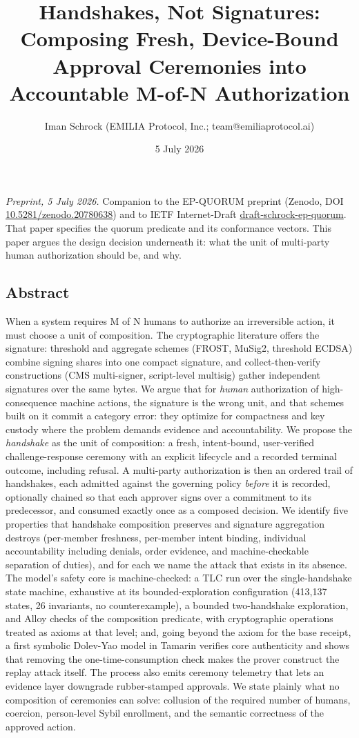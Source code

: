 \documentclass[
  11pt,
]{article}
\title{Handshakes, Not Signatures: Composing Fresh, Device-Bound Approval
Ceremonies into Accountable M-of-N Authorization}
\author{Iman Schrock (EMILIA Protocol, Inc.; team@emiliaprotocol.ai)}
\date{5 July 2026}
\begin{document}
\maketitle

\emph{Preprint, 5 July 2026.} Companion to the EP-QUORUM preprint
(Zenodo, DOI
\href{https://doi.org/10.5281/zenodo.20780638}{10.5281/zenodo.20780638})
and to IETF Internet-Draft
\href{https://datatracker.ietf.org/doc/draft-schrock-ep-quorum/}{draft-schrock-ep-quorum}.
That paper specifies the quorum predicate and its conformance vectors.
This paper argues the design decision underneath it: what the unit of
multi-party human authorization should be, and why.

\subsection{Abstract}\label{abstract}

When a system requires M of N humans to authorize an irreversible
action, it must choose a unit of composition. The cryptographic
literature offers the signature: threshold and aggregate schemes (FROST,
MuSig2, threshold ECDSA) combine signing shares into one compact
signature, and collect-then-verify constructions (CMS multi-signer,
script-level multisig) gather independent signatures over the same
bytes. We argue that for \emph{human} authorization of high-consequence
machine actions, the signature is the wrong unit, and that schemes built
on it commit a category error: they optimize for compactness and key
custody where the problem demands evidence and accountability. We
propose the \emph{handshake} as the unit of composition: a fresh,
intent-bound, user-verified challenge-response ceremony with an explicit
lifecycle and a recorded terminal outcome, including refusal. A
multi-party authorization is then an ordered trail of handshakes, each
admitted against the governing policy \emph{before} it is recorded,
optionally chained so that each approver signs over a commitment to its
predecessor, and consumed exactly once as a composed decision. We
identify five properties that handshake composition preserves and
signature aggregation destroys (per-member freshness, per-member intent
binding, individual accountability including denials, order evidence,
and machine-checkable separation of duties), and for each we name the
attack that exists in its absence. The model's safety core is
machine-checked: a TLC run over the single-handshake state machine,
exhaustive at its bounded-exploration configuration (413,137 states, 26
invariants, no counterexample), a bounded two-handshake exploration, and
Alloy checks of the composition
predicate, with cryptographic operations treated as axioms at that
level; and, going beyond the axiom for the base receipt, a first symbolic
Dolev-Yao model in Tamarin verifies core authenticity and shows that
removing the one-time-consumption check makes the prover construct the
replay attack itself. The process also emits ceremony telemetry that lets an evidence
layer downgrade rubber-stamped approvals. We state plainly what no
composition of ceremonies can solve: collusion of the required number of
humans, coercion, person-level Sybil enrollment, and the semantic
correctness of the approved action.
\end{document}
